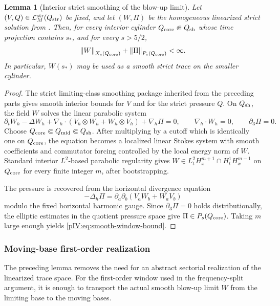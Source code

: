 \documentclass[11pt]{article}
\numberwithin{equation}{section}
\theoremstyle{plain}
\newtheorem{lemma}{Lemma}[section]
\theoremstyle{definition}
\theoremstyle{remark}
\newcommand{\nabh}{\nabla_h}
\newcommand{\divh}{\nabla_h\!\cdot}
\newcommand{\norm}[2]{\left\|#1\right\|_{#2}}
\newcommand{\Lstr}{\mathcal L^{\rm str}}
\begin{document}
\begin{lemma}[Interior strict smoothing of the blow-up limit]\label{pIV:lem:B-smooth-trace-density}
Let \((V,Q)\in\Lstr_M(Q_{\rm str})\) be fixed, and let \((W,\Pi)\) be the homogeneous
linearized strict solution from .  Then, for every
interior cylinder \(Q_{\rm core}\Subset Q_{\rm sh}\) whose time projection contains
\(s_*\), and for every \(s>5/2\),
\begin{equation}\label{pIV:eq:smooth-window-bound}
        \norm{W}{X_s(Q_{\rm core})}+\norm{\Pi}{P_s(Q_{\rm core})}<\infty .
\end{equation}
In particular, \(W(s_*)\) may be used as a smooth strict trace on the smaller cylinder.
\end{lemma}

\begin{proof}
The strict limiting-class smoothing package inherited from the preceding parts gives
smooth interior bounds for \(V\) and for the strict pressure \(Q\).  On \(Q_{\rm sh}\),
the field \(W\) solves the linear parabolic system
\[
        \partial_t W_h-\Delta W_h
        +\nabh\cdot(V_h\otimes W_h+W_h\otimes V_h)+\nabh\Pi=0,
        \qquad
        \divh W_h=0,
        \qquad
        \partial_3\Pi=0 .
\]
Choose \(Q_{\rm core}\Subset Q_{\rm mid}\Subset Q_{\rm sh}\).  After multiplying by a
cutoff which is identically one on \(Q_{\rm core}\), the equation becomes a localized
linear Stokes system with smooth coefficients and commutator forcing controlled by the
local energy norm of \(W\).  Standard interior \(L^2\)-based parabolic regularity gives
\(W\in L^2_tH^{m+1}_x\cap H^1_tH^{m-1}_x\) on \(Q_{\rm core}\) for every finite
integer \(m\), after bootstrapping.

The pressure is recovered from the horizontal divergence equation
\[
        -\Delta_h\Pi
        =
        \partial_a\partial_b(V_aW_b+W_aV_b)
\]
modulo the fixed horizontal harmonic gauge.  Since \(\partial_3\Pi=0\) holds
distributionally, the elliptic estimates in the quotient pressure space give
\(\Pi\in P_s(Q_{\rm core})\).  Taking \(m\) large enough yields
\eqref{pIV:eq:smooth-window-bound}.
\end{proof}

\subsubsection{Moving-base first-order realization}

The preceding lemma removes the need for an abstract sectorial realization of the
linearized trace space.  For the first-order window used in the frequency-split
argument, it is enough to transport the actual smooth blow-up limit \(W\) from the
limiting base to the moving bases.
\end{document}
